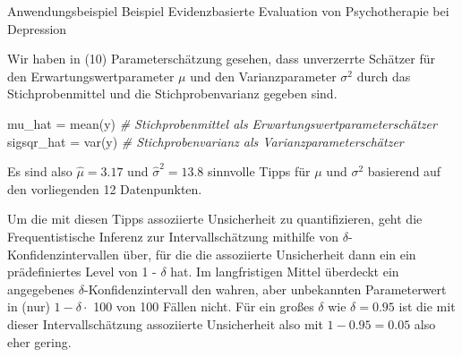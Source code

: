\documentclass[
  8pt,
  ignorenonframetext,
]{beamer}
\newenvironment{Shaded}{\begin{snugshade}}{\end{snugshade}}
\newcommand{\AttributeTok}[1]{\textcolor[rgb]{0.77,0.63,0.00}{#1}}
\newcommand{\CommentTok}[1]{\textcolor[rgb]{0.56,0.35,0.01}{\textit{#1}}}
\newcommand{\FunctionTok}[1]{\textcolor[rgb]{0.00,0.00,0.00}{#1}}
\newcommand{\NormalTok}[1]{#1}
\newcommand{\OtherTok}[1]{\textcolor[rgb]{0.56,0.35,0.01}{#1}}
\newcommand{\SpecialCharTok}[1]{\textcolor[rgb]{0.00,0.00,0.00}{#1}}
\newcommand{\StringTok}[1]{\textcolor[rgb]{0.31,0.60,0.02}{#1}}
\begin{document}
\begin{frame}[fragile,t]{Anwendungsbeispiel}
\protect\hypertarget{anwendungsbeispiel-3}{}
Beispiel \textbar{} Evidenzbasierte Evaluation von Psychotherapie bei
Depression

\vspace{2mm}
\footnotesize

\begin{Shaded}
\end{Shaded}

Wir haben in (10) Parameterschätzung gesehen, dass unverzerrte Schätzer
für den Erwartungswertparameter \(\mu\) und den Varianzparameter
\(\sigma^2\) durch das Stichprobenmittel und die Stichprobenvarianz
gegeben sind.

\vspace{3mm}

\begin{Shaded}
\begin{Highlighting}[]
\NormalTok{mu\_hat     }\OtherTok{=} \FunctionTok{mean}\NormalTok{(y)    }\CommentTok{\# Stichprobenmittel als Erwartungswertparameterschätzer}
\NormalTok{sigsqr\_hat }\OtherTok{=} \FunctionTok{var}\NormalTok{(y)     }\CommentTok{\# Stichprobenvarianz als Varianzparameterschätzer}
\end{Highlighting}
\end{Shaded}

Es sind also \(\hat{\mu} = 3.17\) und \(\hat{\sigma}^{2} = 13.8\)
sinnvolle Tipps für \(\mu\) und \(\sigma^2\) basierend auf den
vorliegenden 12 Datenpunkten.

Um die mit diesen Tipps assoziierte Unsicherheit zu quantifizieren, geht
die Frequentistische Inferenz zur Intervallschätzung mithilfe von
\(\delta\)-Konfidenzintervallen über, für die die assoziierte
Unsicherheit dann ein ein prädefiniertes Level von 1 - \(\delta\) hat.
Im langfristigen Mittel überdeckt ein angegebenes
\(\delta\)-Konfidenzintervall den wahren, aber unbekannten Parameterwert
in (nur) \(1-\delta\cdot\) 100 von 100 Fällen nicht. Für ein großes
\(\delta\) wie \(\delta = 0.95\) ist die mit dieser Intervallschätzung
assoziierte Unsicherheit also mit \(1 - 0.95 = 0.05\) also eher gering.
\end{frame}
\end{document}
